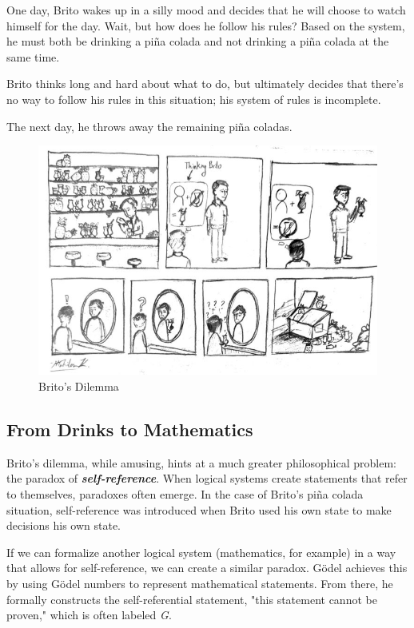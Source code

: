 \documentclass[conference]{IEEEtran}
\begin{document}
One day, Brito wakes up in a silly mood and decides that he will choose to watch himself for the day. Wait, but how does he follow his rules? Based on the system, he must both be drinking a piña colada and not drinking a piña colada at the same time. 

Brito thinks long and hard about what to do, but ultimately decides that there's no way to follow his rules in this situation; his system of rules is incomplete.

The next day, he throws away the remaining piña coladas.

\begin{figure}[htbp]
\centerline{\includegraphics{PinaColada.jpg}}
\caption{Brito's Dilemma}
\label{Pina Colada Situation Image}
\end{figure}

\subsection{From Drinks to Mathematics}
Brito's dilemma, while amusing, hints at a much greater philosophical problem: the paradox of \emph{\textbf{self-reference}}. When logical systems create statements that refer to themselves, paradoxes often emerge. In the case of Brito's piña colada situation, self-reference was introduced when Brito used his own state to make decisions his own state. 

If we can formalize another logical system (mathematics, for example) in a way that allows for self-reference, we can create a similar paradox. Gödel achieves this by using Gödel numbers to represent mathematical statements. From there, he formally constructs the self-referential statement, "this statement cannot be proven," which is often labeled \textit{G}. 
\end{document}
